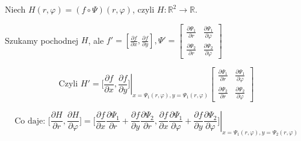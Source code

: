\documentclass[../main.tex]{subfiles}
\begin{document}
\vspace{0.3cm}
Niech $H(r,\varphi) = (f \circ \Psi) (r, \varphi)$, czyli $H : \mathbb{R}^2 \to \mathbb{R}$.

Szukamy pochodnej $H$, ale $f' = [\frac{\partial f}{\partial x} , \frac{\partial f}{\partial y} ], \Psi ' = \left [ \begin{matrix}
\frac{\partial \Psi_1}{\partial r}  &\frac{\partial \Psi_1}{\partial \varphi} \\
\frac{\partial \Psi_2}{\partial r}  &\frac{\partial \Psi_2}{\partial \varphi}
\end{matrix}\right ]$

$$ \text{Czyli } H' = \left . \Big [ \frac{\partial f}{\partial x} , \frac{\partial f}{\partial y} \Big ] \right |_{x=\Psi_1(r,\varphi), y=\Psi_1(r,\varphi)} \left [ \begin{matrix}
\frac{\partial \Psi_1}{\partial r}  &\frac{\partial \Psi_1}{\partial \varphi} \\
\frac{\partial \Psi_2}{\partial r}  &\frac{\partial \Psi_2}{\partial \varphi}
\end{matrix}\right ]$$

$$ \text{Co daje: } \left . \Big [ \frac{\partial H}{\partial r} , \frac{\partial H}{\partial \varphi} \Big ] = \Big [ \frac{\partial f}{\partial x} \frac{\partial \Psi_1}{\partial r} + \frac{\partial f}{\partial y} \frac{\partial \Psi_2}{\partial r} , \frac{\partial f}{\partial x} \frac{\partial \Psi_1}{\partial \varphi} + \frac{\partial f}{\partial y} \frac{\partial \Psi_2}{\partial \varphi} \Big ] \right |_{x = \Psi_1 (r,\varphi), y = \Psi_2 (r,\varphi)} $$
\end{document}
